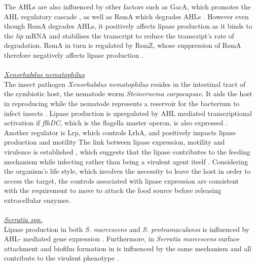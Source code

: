 \documentclass[twoside]{article}
\begin{document}
The AHLs are also influenced by other factors such as GacA, which promotes the AHL regulatory cascade \cite{reimmann1997}, as well as RsmA which degrades AHLs \cite{pessi2001}. However even though RsmA degrades AHLs, it positively affects lipase production as it binds to the \textit{lip} mRNA and stabilises the transcript to reduce the transcript's rate of degradation. RsmA in turn is regulated by RsmZ, whose suppression of RsmA therefore negatively affects lipase production \cite{heurlier2004}. 
\\
\\ \emph{\underline{Xenorhabdus nematophilus}} 
\\The insect pathogen \emph{Xenorhabdus nematophilus} resides in the intestinal tract of the symbiotic host, the nematode worm \emph{Steinernema carpocapsae}. It aids the host in reproducing while the nematode represents a reservoir for the bacterium to infect insects \cite{herbert2007}. Lipase production is upregulated by  AHL mediated transcriptional activation \cite{dunphy_97} if \emph{flhDC}, which is the flagella master operon, is also expressed \cite{rosenau2000}. Another regulator is Lrp, which controls LrhA, and positively impacts lipase production and motility \cite{richards2008} 
The link between lipase expression, motility and virulence is established \cite{givaudan_00}, which suggests that the lipase contributes to the feeding mechanism while infecting rather than being a virulent agent itself \cite{richards2010}. Considering the organism's life style, which involves the necessity to leave the host in order to access the target, the controls associated with lipase expression are consistent with the requirement to move to attack the food source before releasing extracellular enzymes.
\\
\\ \emph{\underline{Serratia spp.}} 
\\Lipase production in both \emph{S. marcescens} and \emph{S. proteamaculanss} is influenced by AHL- mediated gene expression \cite{horng2002,shibatani2000,christensen_03}. Furthermore, in \emph{Serratia marcescens} surface attachment and biofilm formation in is influenced by the same mechanism \cite{labbate2007} and all contribute to the virulent phenotype \cite{hejazi_97}.

\newpage
{}
\end{document}
